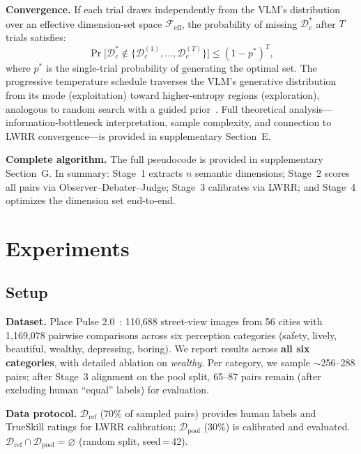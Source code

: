 \documentclass[runningheads]{llncs}
\begin{document}
\smallskip\noindent\textbf{Convergence.}
If each trial draws independently from the VLM's distribution over an effective dimension-set space $\mathcal{F}_{\mathrm{eff}}$, the probability of missing $\mathcal{D}_c^*$ after $T$ trials satisfies:
\begin{equation}
\Pr\bigl[\mathcal{D}_c^* \notin \{\mathcal{D}_c^{(1)}, \ldots, \mathcal{D}_c^{(T)}\}\bigr] \leq (1 - p^*)^T,
\label{eq:convergence}
\end{equation}
where $p^*$ is the single-trial probability of generating the optimal set.
The progressive temperature schedule traverses the VLM's generative distribution from its mode (exploitation) toward higher-entropy regions (exploration), analogous to random search with a guided prior~\cite{bergstra2012random}.
Full theoretical analysis---information-bottleneck interpretation, sample complexity, and connection to LWRR convergence---is provided in supplementary Section~E.

\smallskip\noindent\textbf{Complete algorithm.}
The full pseudocode is provided in supplementary Section~G.
In summary: Stage~1 extracts $n$ semantic dimensions; Stage~2 scores all pairs via Observer--Debater--Judge; Stage~3 calibrates via LWRR; and Stage~4 optimizes the dimension set end-to-end.


\section{Experiments}
\label{sec:exp}

\subsection{Setup}

\noindent\textbf{Dataset.}
Place Pulse 2.0~\cite{salesses2013collaborative}: 110,688 street-view images from 56 cities with 1,169,078 pairwise comparisons across six perception categories (safety, lively, beautiful, wealthy, depressing, boring).
We report results across \textbf{all six categories}, with detailed ablation on \emph{wealthy}.
Per category, we sample ${\sim}$256--288 pairs; after Stage~3 alignment on the pool split, 65--87 pairs remain (after excluding human ``equal'' labels) for evaluation.

\smallskip\noindent\textbf{Data protocol.}
$\mathcal{D}_{\mathrm{ref}}$ (70\% of sampled pairs) provides human labels and TrueSkill ratings for LWRR calibration; $\mathcal{D}_{\mathrm{pool}}$ (30\%) is calibrated and evaluated.
$\mathcal{D}_{\mathrm{ref}} \cap \mathcal{D}_{\mathrm{pool}} = \varnothing$ (random split, seed\,=\,42).
\end{document}
